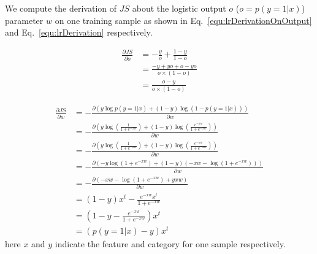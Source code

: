 \documentclass[runningheads,openany]{xhlPaper}
\begin{document}
We compute the derivation of $JS$ about the logistic output $o$ ($o = p\left( {{y} = 1|{x}}\right)$) parameter $w$ on one training sample as shown in Eq.~\ref{equ:lrDerivationOnOutput} and Eq.~\ref{equ:lrDerivation} respectively.

\begin{equation}
\label{equ:lrDerivationOnOutput}
\begin{aligned}
\frac{\partial JS}{\partial o}&=-\frac{y}{o}+\frac{1-y}{1-o}\\
&=\frac{-y+yo+o-yo}{o\times \left ( 1-o \right )}\\
&=\frac{o-y}{o\times \left ( 1-o \right )}
\end{aligned}
\end{equation}

\begin{equation}
\label{equ:lrDerivation}
\begin{aligned}
\frac{{\partial JS}}{{\partial w}} &=  - \frac{{\partial \left( {{y}\log p\left( {{y} = 1|{x}} \right) + \left( {1 - y} \right)\log \left( {1 - p\left( {{y} = 1|{x}} \right)} \right)} \right)}}{{\partial w}}\\
 &=  - \frac{{\partial \left( {y\log \left( {\frac{1}{{1 + {e^{ - xw}}}}} \right) + \left( {1 - y} \right)\log \left( {\frac{{{e^{ - xw}}}}{{1 + {e^{ - xw}}}}} \right)} \right)}}{{\partial w}}\\
 &=  - \frac{{\partial \left( {{y}\log \left( {\frac{1}{{1 + {e^{ - {x}w}}}}} \right) + \left( {1 - {y}} \right)\log \left( {\frac{{{e^{ - {x}w}}}}{{1 + {e^{ - {x}w}}}}} \right)} \right)}}{{\partial w}}\\
 &=  - \frac{{\partial \left( { - {y}\log \left( {1 + {e^{ - {x}w}}} \right) + \left( {1 - {y}} \right)\left( { - {x}w - \log \left( {1 + {e^{ - {x}w}}} \right)} \right)} \right)}}{{\partial w}}\\
 &=  - \frac{{\partial \left( { - {x}w - \log \left( {1 + {e^{ - {x}w}}} \right) + {y}{x}w} \right)}}{{\partial w}}\\
 &= \left( {1 - {y}} \right){{x} ^t} - \frac{{{e^{ - {x}w}}{{x} ^t}}}{{1 + {e^{ - {x}w}}}}\\
 &= \left( {1 - {y} - \frac{{{e^{ - {x}w}}}}{{1 + {e^{ - {x}w}}}}} \right){{x} ^t}\\
 &= \left( {p\left( {{y} = 1|{x}} \right) - {y}} \right){{x} ^t}
\end{aligned}
\end{equation}
here $x$ and $y$ indicate the feature and category for one sample respectively.
\end{document}
